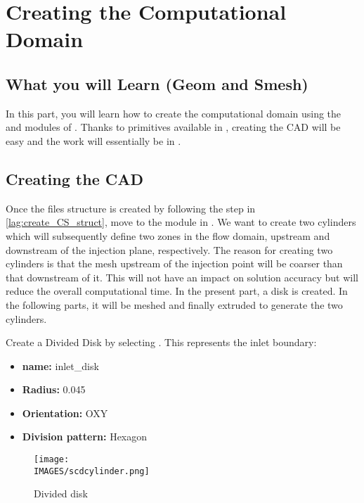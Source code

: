 \section{Creating the Computational Domain}
%
\subsection{What you will Learn (Geom and Smesh)}
In this part, you will learn how to create the computational domain using the \geom and \smesh modules of \salome. Thanks to primitives available in \geom, creating the CAD will be easy and the work will essentially be in \smesh.
%
\subsection{Creating the CAD}
%
Once the files structure is created by following the step in \ref{lag:create_CS_struct}, move to the \geom module in \salome. We want to create two cylinders which will subsequently define two zones in the flow domain, upstream and downstream of the injection plane, respectively. The reason for creating two cylinders is that the mesh upstream of the injection point will be coarser than that downstream of it.  This will not have an impact on solution accuracy but will reduce the overall computational time. In the present part, a disk is created. In the following parts, it will be meshed and finally extruded to generate the two cylinders.

Create a Divided Disk by selecting . This represents the inlet boundary:
%
\begin{itemize}
	\item \textbf{name:} inlet\_disk 
	\item  \textbf{Radius:} 0.045
	\item \textbf{Orientation:} OXY
	\item \textbf{Division pattern:} Hexagon
\end{itemize} 
%
\begin{figure}[hbtp]
	\centering
	\texttt{[image: \\IMAGES/scdcylinder.png]}
	\caption{Divided disk}
	\label{lag:scd_cylinder}
\end{figure}
%

